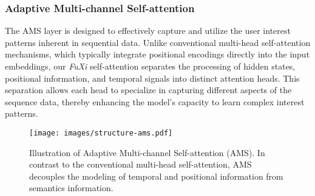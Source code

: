 \subsubsection{Adaptive Multi-channel Self-attention} 
The AMS layer is designed to effectively capture and utilize the user interest patterns inherent in sequential data. Unlike conventional multi-head self-attention mechanisms, which typically integrate positional encodings directly into the input embeddings, our \textit{FuXi} self-attention separates the processing of hidden states, positional information, and temporal signals into distinct attention heads. This separation allows each head to specialize in capturing different aspects of the sequence data, thereby enhancing the model's capacity to learn complex interest patterns.

\begin{figure}
    \centering
    \setlength{\abovecaptionskip}{5pt}
    \setlength{\belowcaptionskip}{-10pt}
    \texttt{[image: images/structure-ams.pdf]}
    \caption{Illustration of Adaptive Multi-channel Self-attention (AMS). In contrast to the conventional multi-head self-attention, AMS decouples the modeling of temporal and positional information from semantics information. }
    \label{fig:structure-fuxi-attention}
\end{figure}

